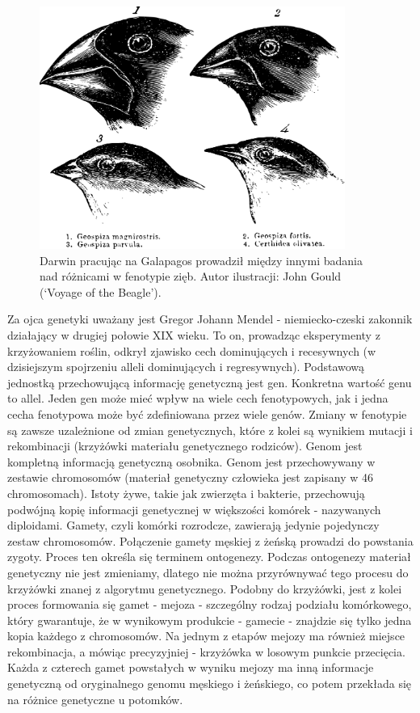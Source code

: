 \documentclass[a4paper,11pt]{article}
\begin{document}
    \begin{figure}[H]
        \label{fig:darwin_birds}
        \centering
        \includegraphics[width=10cm]{darwin_birds}
        \caption{Darwin pracując na Galapagos prowadził między innymi badania nad różnicami w fenotypie zięb. Autor ilustracji: John Gould (`Voyage of the Beagle').}
    \end{figure}

    \bigskip

    Za ojca genetyki uważany jest Gregor Johann Mendel - niemiecko-czeski zakonnik działający w drugiej połowie XIX wieku. To on, prowadząc eksperymenty z krzyżowaniem roślin, odkrył zjawisko cech dominujących i recesywnych (w dzisiejszym spojrzeniu alleli dominujących i regresywnych). Podstawową jednostką przechowującą informację genetyczną jest gen. Konkretna wartość genu to allel. Jeden gen może mieć wpływ na wiele cech fenotypowych, jak i jedna cecha fenotypowa może być zdefiniowana przez wiele genów. Zmiany w fenotypie są zawsze uzależnione od zmian genetycznych, które z kolei są wynikiem mutacji i rekombinacji (krzyżówki materiału genetycznego rodziców). Genom jest kompletną informacją genetyczną osobnika. Genom jest przechowywany w zestawie chromosomów (materiał genetyczny człowieka jest zapisany w 46 chromosomach). Istoty żywe, takie jak zwierzęta i bakterie, przechowują podwójną kopię informacji genetycznej w większości komórek - nazywanych diploidami. Gamety, czyli komórki rozrodcze, zawierają jedynie pojedynczy zestaw chromosomów. Połączenie gamety męskiej z żeńską prowadzi do powstania zygoty. Proces ten określa się terminem ontogenezy. Podczas ontogenezy materiał genetyczny nie jest zmieniamy, dlatego nie można przyrównywać tego procesu do krzyżówki znanej z algorytmu genetycznego. Podobny do krzyżówki, jest z kolei proces formowania się gamet - mejoza - szczególny rodzaj podziału komórkowego, który gwarantuje, że w wynikowym produkcie - gamecie - znajdzie się tylko jedna kopia każdego z chromosomów. Na jednym z etapów mejozy ma również miejsce rekombinacja, a mówiąc precyzyjniej - krzyżówka w losowym punkcie przecięcia. Każda z czterech gamet powstałych w wyniku mejozy ma inną informacje genetyczną od oryginalnego genomu męskiego i żeńskiego, co potem przekłada się na różnice genetyczne u potomków\cite{IntroductionToEvolutionaryComputing2015}.
\end{document}
